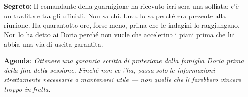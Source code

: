 \clearpage

\begin{secretbox}
  \textbf{Segreto:} Il comandante della guarnigione ha ricevuto ieri sera una
  soffiata: c'è un traditore tra gli ufficiali. Non sa chi. Luca lo sa perché
  era presente alla riunione. Ha quarantotto ore, forse meno, prima che le
  indagini lo raggiungano. Non lo ha detto ai Doria perché non vuole che
  accelerino i piani prima che lui abbia una via di uscita garantita.

  \medskip\noindent\textcolor{SecretRed}{\textbf{Agenda:}}
  \textit{Ottenere una garanzia scritta di protezione dalla famiglia Doria
  prima della fine della sessione. Finché non ce l'ha, passa solo le
  informazioni strettamente necessarie a mantenersi utile — non quelle
  che li farebbero vincere troppo in fretta.}
\end{secretbox}
